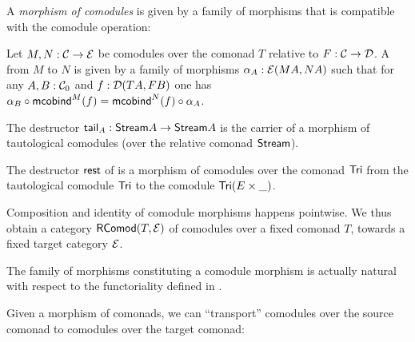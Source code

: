 \documentclass[envcountsame]{llncs}
\begin{document}
A \emph{morphism of comodules} is given by a family of morphisms that is compatible with 
the comodule operation:

\begin{definition}%
\label{def:morphism_of_comodules}
 Let $M, N : \C \to \E$ be comodules over the comonad $T$ relative to  $F:\C \to \D$.
 A  from $M$ to $N$ is given by a family of morphisms 
   $ \alpha_A:\E(MA,NA) $
 such that for any $A,B:\C_0$ and $f : \D(TA,FB)$ one has
 $\comp{\mcobind^M(f)}{\alpha_B} = \comp{\alpha_A}{\mcobind^N(f)}$.
\end{definition}

 \begin{example}\label{ex_tail_comodule}
  The destructor $\stail_A : \stream A \to \stream A$ is the carrier of a morphism of tautological comodules (over the relative comonad $\stream$).
 \end{example}

\begin{example}\label{ex:tail_comodule}
 The destructor $\tail$ of  is a morphism of comodules over the comonad $\Tri$ 
  from the tautological comodule  $\Tri$ to the comodule $\Tri(E\times \_)$. %
\end{example}

Composition and identity of comodule morphisms happens pointwise. We thus obtain a category $\RComod(T,\E)$
 of comodules
over a fixed comonad $T$, towards a fixed target category $\E$.

% 


\begin{Long}
\begin{remark}
  The family of morphisms constituting a comodule morphism is actually natural with respect to the functoriality 
  defined in .
\end{remark}
\end{Long}

Given a morphism of comonads, we can \enquote{transport} comodules over the source comonad to comodules over the target comonad:
\end{document}
